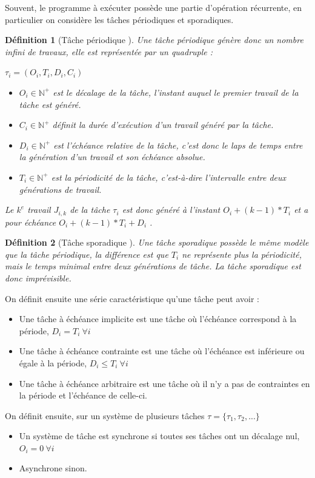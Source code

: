 \documentclass[11pt,a4paper,oneside]{book}
\theoremstyle{break}
\newtheorem{defin}{Définition}
\theoremstyle{breakplain}
\begin{document}
Souvent, le programme à exécuter possède une partie d'opération récurrente, en particulier on considère les tâches périodiques et sporadiques.

\begin{defin}[Tâche périodique \cite{goossens1999scheduling}]
Une tâche périodique génère donc un nombre infini de travaux, elle est représentée par un quadruple :
\begin{center}
$\tau_i = (O_i, T_i, D_i, C_i)$
\end{center}
\begin{itemize}
\item $O_i \in \mathbb{N}^{+}$ est le décalage de la tâche, l'instant auquel le premier travail de la tâche est généré.
\item $C_i \in \mathbb{N}^{+}$ définit la durée d'exécution d'un travail généré par la tâche.
\item $D_i \in \mathbb{N}^{+}$ est l'échéance relative de la tâche, c'est donc le laps de temps entre la génération d'un travail et son échéance absolue.
\item $T_i \in \mathbb{N}^{+}$ est la périodicité de la tâche, c'est-à-dire l'intervalle entre deux générations de travail.\\
\end{itemize}
Le $k^{e}$ travail $J_{i,k}$ de la tâche $\tau_i$ est donc généré à l'instant $O_i + (k-1)*T_i$ et a pour échéance  $O_i+(k-1)*T_i+D_i$ .
\end{defin}
\begin{defin}[Tâche sporadique \cite{goossens1999scheduling}]
Une tâche sporadique possède le même modèle que la tâche périodique, la différence est que $T_i$ ne représente plus la périodicité, mais le temps minimal entre deux générations de tâche. La tâche sporadique est donc imprévisible.
\end{defin}


On définit ensuite une série caractéristique \cite{goossens1999scheduling} qu'une tâche peut avoir :
\begin{itemize}
\item Une tâche à échéance implicite est une tâche où l'échéance correspond à la période, $D_i = T_i\ \forall i$
\item Une tâche à échéance contrainte est une tâche où l'échéance est inférieure ou égale à la période, $D_i \le T_i\ \forall i$
\item Une tâche à échéance arbitraire est une tâche où il n'y a pas de contraintes en la période et l'échéance de celle-ci.
\end{itemize}
On définit ensuite, sur un système de plusieurs tâches $\tau = \{\tau_1, \tau_2, ...\}$
\begin{itemize}
\item Un système de tâche est synchrone si toutes ses tâches ont un décalage nul, $O_i = 0\ \forall i$
\item Asynchrone sinon.
\end{itemize}
\end{document}
